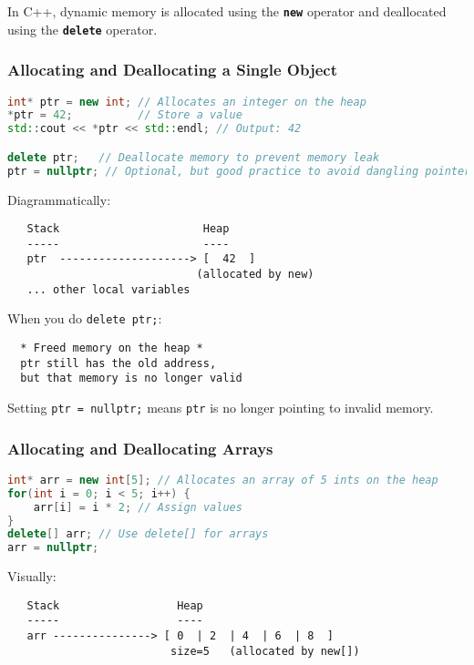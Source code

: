 \documentclass[a4paper,12pt]{article}
\begin{document}
In C++, dynamic memory is allocated using the \textbf{\texttt{new}} operator and deallocated using the \textbf{\texttt{delete}} operator.

\subsubsection{Allocating and Deallocating a Single Object}

\begin{lstlisting}[language=C++]
int* ptr = new int; // Allocates an integer on the heap
*ptr = 42;          // Store a value
std::cout << *ptr << std::endl; // Output: 42

delete ptr;   // Deallocate memory to prevent memory leak
ptr = nullptr; // Optional, but good practice to avoid dangling pointer
\end{lstlisting}

Diagrammatically:

\begin{verbatim}
   Stack                      Heap
   -----                      ----
   ptr  --------------------> [  42  ]
                             (allocated by new)
   ... other local variables
\end{verbatim}

When you do \texttt{delete ptr;}:

\begin{verbatim}
  * Freed memory on the heap *
  ptr still has the old address,
  but that memory is no longer valid
\end{verbatim}

Setting \texttt{ptr = nullptr;} means \texttt{ptr} is no longer pointing to invalid memory.

\subsubsection{Allocating and Deallocating Arrays}

\begin{lstlisting}[language=C++]
int* arr = new int[5]; // Allocates an array of 5 ints on the heap
for(int i = 0; i < 5; i++) {
    arr[i] = i * 2; // Assign values
}
delete[] arr; // Use delete[] for arrays
arr = nullptr;
\end{lstlisting}

Visually:

\begin{verbatim}
   Stack                  Heap
   -----                  ----
   arr ---------------> [ 0  | 2  | 4  | 6  | 8  ]
                         size=5   (allocated by new[])
\end{verbatim}
\end{document}
